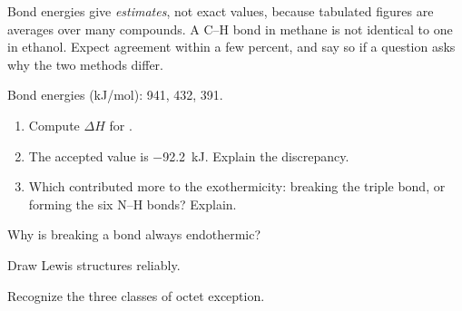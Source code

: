 \documentclass{apchem-notes}
\begin{document}
\begin{apcnote}
Bond energies give \emph{estimates}, not exact values, because tabulated
figures are averages over many compounds. A C--H bond in methane is not
identical to one in ethanol. Expect agreement within a few percent, and say
so if a question asks why the two methods differ.
\end{apcnote}


Bond energies (kJ/mol):  941,  432,  391.

\begin{enumerate}[leftmargin=*,itemsep=0.4em]
  \item Compute $\Delta H$ for .
        \workspace[2.6cm]
  \item The accepted value is \SI{-92.2}{\kilo\joule}. Explain the
        discrepancy. 
  \item Which contributed more to the exothermicity: breaking the triple
        bond, or forming the six N--H bonds? Explain.
\end{enumerate}

\begin{exitticket}
Why is breaking a bond always endothermic? 
\end{exitticket}


\begin{objectives}
  \item Draw Lewis structures reliably.
  \item Recognize the three classes of octet exception.
\end{objectives}
\end{document}
